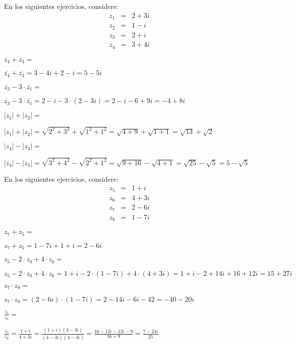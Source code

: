 \documentclass[12pt,addpoints,x11names]{exam}
\begin{document}
\begin{questions}
En los siguientes ejercicios, considere:
\begin{eqnarray*}
  z_1&=&2+3i\\
  z_2&=&1-i\\
  z_3&=&2+i\\
  z_4&=&3+4i
\end{eqnarray*}

 \question[3] $\overline{z_4}+\overline{z_3}=$
   \begin{solutionbox}{1.3in}
     $\overline{z_4}+\overline{z_3}=3-4i+2-i=5-5i$
  \end{solutionbox}
\question[3] $\overline{z_3}-3\cdot\overline{z_1}=$
   \begin{solutionbox}{1.3in}
     $\overline{z_3}-3\cdot\overline{z_1}=2-i-3\cdot(2-3i)=2-i-6+9i=-4+8i$
  \end{solutionbox}
\question[3] $|z_1|+|z_2|=$
   \begin{solutionbox}{1.3in}
     $|z_1|+|z_2|=\sqrt{2^{2}+3^{2}}+\sqrt{1^{2}+1^{2}}=\sqrt{4+9}+\sqrt{1+1}=\sqrt{13}+\sqrt{2}$
  \end{solutionbox}
\question[3] $|z_4|-|z_3|=$
  \begin{solutionbox}{1.3in}
     $|z_4|-|z_3|=\sqrt{3^{2}+4^{2}}-\sqrt{2^{2}+1^{2}}=\sqrt{9+16}-\sqrt{4+1}=\sqrt{25}-\sqrt{5}=5-\sqrt{5}$
  \end{solutionbox}
  \pagebreak

En los siguientes ejercicios, considere:
\begin{eqnarray*}
  z_5&=&1+i\\
  z_6&=&4+3i\\
  z_7&=&2-6i\\
  z_8&=&1-7i
\end{eqnarray*}

 
\question[3] $z_7+z_5=$
  \begin{solutionbox}{1.2in}
     $z_7+z_5=1-7i+1+i=2-6i$
  \end{solutionbox}
\question[3] $z_5-2\cdot z_8+4\cdot z_6=$
  \begin{solutionbox}{1.2in}
     $z_5-2\cdot z_8+4\cdot z_6=1+i-2\cdot(1-7i)+4\cdot(4+3i)=1+i-2+14i+16+12i=15+27i$
  \end{solutionbox}
\question[3] $z_7\cdot z_8=$
  \begin{solutionbox}{1.2in}
     $z_7\cdot z_8=(2-6i)\cdot(1-7i)=2-14i-6i-42=-40-20i$
  \end{solutionbox}
\question[3] $\frac{z_5}{z_6}=$
  \begin{solutionbox}{1.2in}
     $\frac{z_5}{z_6}=\frac{1+i}{4+3i}=\frac{(1+i)(4-3i)}{(4-3i)(4-3i)}=\frac{16-12i-12i-9}{16+9}=\frac{7-24i}{25}$
  \end{solutionbox}













\end{questions}
\end{document}
